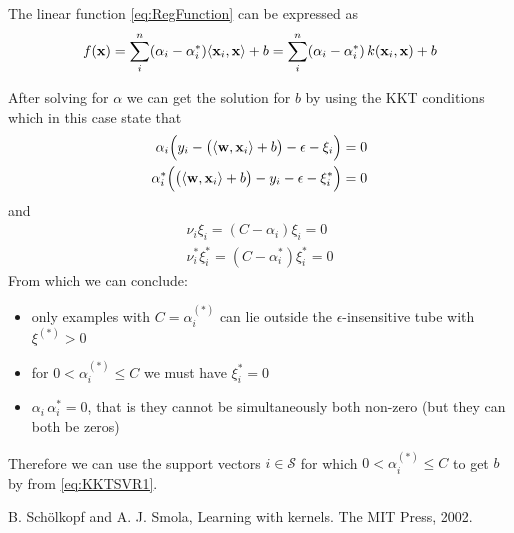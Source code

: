 The linear function \eqref{eq:RegFunction} can be expressed as
\begin{equation}\label{eq:RegFunction2}
 f(\mathbf{x}) = \sum_i^n (\alpha_i - \alpha^*_i) \langle \mathbf{x}_i, \mathbf{x} \rangle + b = \sum_i^n (\alpha_i - \alpha^*_i) \, k( \mathbf{x}_i, \mathbf{x} ) + b 
\end{equation}

After solving for $\alpha$ we can get the solution for $b$ by using the KKT conditions which in this case state that
\begin{eqnarray}\label{eq:KKTSVR1}
 \alpha_i \Big( y_i - \big( \langle \mathbf{w},\mathbf{x}_i \rangle + b \big) - \epsilon - \xi_i \Big) = 0 \nonumber \\
 \alpha^*_i \Big( \big( \langle \mathbf{w},\mathbf{x}_i \rangle + b \big) - y_i - \epsilon - \xi^*_i \Big) = 0 
\end{eqnarray}
and
\begin{eqnarray}
 \nu_i \xi_i = (C - \alpha_i)\xi_i = 0 \nonumber \\
 \nu_i^* \xi^*_i = (C - \alpha^*_i)\xi^*_i = 0 
\end{eqnarray}
From which we can conclude:
\begin{itemize}
\item only examples with $C=\alpha^{(*)}_i$ can lie outside the $\epsilon$-insensitive tube with $\xi^{(*)} > 0$
\item for $0 < \alpha^{(*)}_i \leq C$ we must have $\xi^*_i=0$
\item $\alpha_i \, \alpha^*_i = 0$, that is they cannot be simultaneously both non-zero (but they can both be zeros)
\end{itemize}

Therefore we can use the support vectors $i \in \mathcal{S}$ for which $0 < \alpha^{(*)}_i \leq C$ to get $b$ by from \eqref{eq:KKTSVR1}.



\begin{thebibliography}{9}

B. Schölkopf and A. J. Smola, Learning with kernels. The MIT Press, 2002.

\end{thebibliography}
